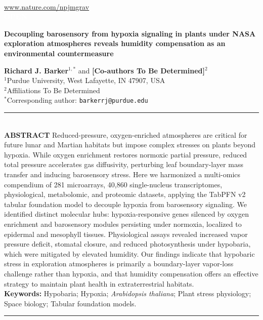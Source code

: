 \documentclass[10pt,a4paper]{article}
\begin{document}
\noindent{\color{npjteal}\rule{\linewidth}{2pt}}\\[3pt]
 \hfill {\small \textsf{\url{www.nature.com/npjmgrav}}}\\[4pt]
 \hfill \colorbox{openaccessgreen}{\textcolor{white}{\footnotesize\textbf{\textsf{\;\;OPEN\;\;}}}}\\[10pt]

{\raggedright \huge \textbf{\textsf{Decoupling barosensory from hypoxia signaling in plants under NASA exploration atmospheres reveals humidity compensation as an environmental countermeasure}}\\[12pt]}

{\normalsize \textsf{\textbf{Richard J. Barker$^{1,*}$} and \textbf{[Co-authors To Be Determined]$^2$}}}\\[4pt]
{\footnotesize \textsf{$^1$Purdue University, West Lafayette, IN 47907, USA\\
$^2$Affiliations To Be Determined\\
$^*$Corresponding author: \texttt{barkerrj@purdue.edu}}}\\[12pt]

\noindent
{\color{gray!40}\rule{\linewidth}{0.5pt}}\\[4pt]
\noindent
\textbf{\textsf{ABSTRACT}}\;\;
Reduced-pressure, oxygen-enriched atmospheres are critical for future lunar and Martian habitats but impose complex stresses on plants beyond hypoxia. While oxygen enrichment restores normoxic partial pressure, reduced total pressure accelerates gas diffusivity, perturbing leaf boundary-layer mass transfer and inducing barosensory stress. Here we harmonized a multi-omics compendium of 281 microarrays, 40,860 single-nucleus transcriptomes, physiological, metabolomic, and proteomic datasets, applying the TabPFN v2 tabular foundation model to decouple hypoxia from barosensory signaling. We identified distinct molecular hubs: hypoxia-responsive genes silenced by oxygen enrichment and barosensory modules persisting under normoxia, localized to epidermal and mesophyll tissues. Physiological assays revealed increased vapor pressure deficit, stomatal closure, and reduced photosynthesis under hypobaria, which were mitigated by elevated humidity. Our findings indicate that hypobaric stress in exploration atmospheres is primarily a boundary-layer vapor-loss challenge rather than hypoxia, and that humidity compensation offers an effective strategy to maintain plant health in extraterrestrial habitats.\\[6pt]
\noindent
\textbf{\textsf{Keywords:}} Hypobaria; Hypoxia; \textit{Arabidopsis thaliana}; Plant stress physiology; Space biology; Tabular foundation models.\\[4pt]
\noindent
{\color{gray!40}\rule{\linewidth}{0.5pt}}\\[6pt]
\end{document}
